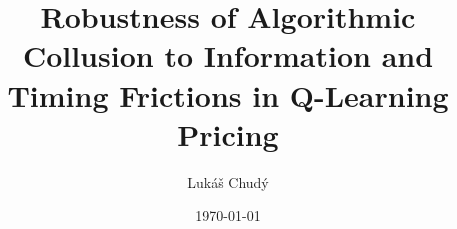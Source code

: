 \documentclass[11pt,a4paper]{article}
\title{
    \vspace{-1.5cm}
    \textbf{Robustness of Algorithmic Collusion to Information and Timing Frictions in Q-Learning Pricing} \\
    \vspace{0.3cm}
    \normalsize{\repolink}
}
\author{Luk\'a\v{s} Chud\'y}
\date{\today}
\begin{document}
\maketitle

\begin{abstract}
\noindent

\end{abstract}












\appendix

\end{document}
